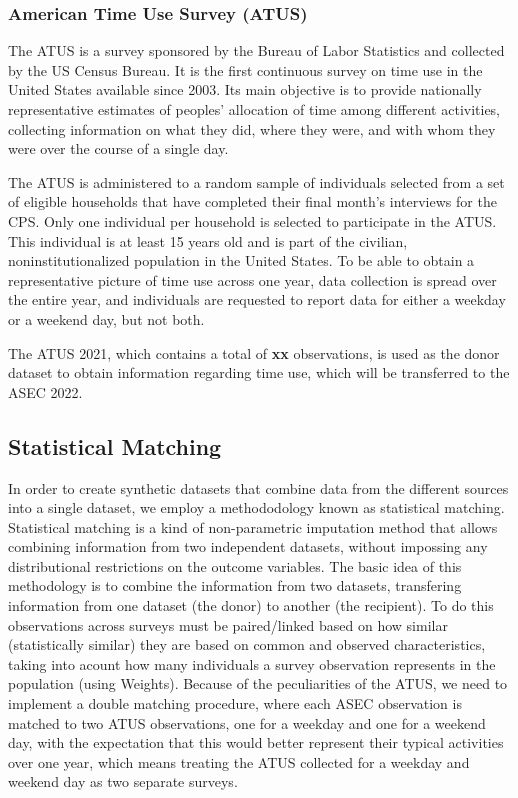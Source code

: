 \documentclass[
  11pt,
]{article}
\begin{document}
\subsubsection{American Time Use Survey
(ATUS)}\label{american-time-use-survey-atus}

The ATUS is a survey sponsored by the Bureau of Labor Statistics and
collected by the US Census Bureau. It is the first continuous survey on
time use in the United States available since 2003. Its main objective
is to provide nationally representative estimates of peoples' allocation
of time among different activities, collecting information on what they
did, where they were, and with whom they were over the course of a
single day.

The ATUS is administered to a random sample of individuals selected from
a set of eligible households that have completed their final month's
interviews for the CPS. Only one individual per household is selected to
participate in the ATUS. This individual is at least 15 years old and is
part of the civilian, noninstitutionalized population in the United
States. To be able to obtain a representative picture of time use across
one year, data collection is spread over the entire year, and
individuals are requested to report data for either a weekday or a
weekend day, but not both.

The ATUS 2021, which contains a total of \textbf{xx} observations, is
used as the donor dataset to obtain information regarding time use,
which will be transferred to the ASEC 2022.

\subsection{Statistical Matching}\label{statistical-matching}

In order to create synthetic datasets that combine data from the
different sources into a single dataset, we employ a methododology known
as statistical matching. Statistical matching is a kind of
non-parametric imputation method that allows combining information from
two independent datasets, without impossing any distributional
restrictions on the outcome variables. The basic idea of this
methodology is to combine the information from two datasets, transfering
information from one dataset (the donor) to another (the recipient). To
do this observations across surveys must be paired/linked based on how
similar (statistically similar) they are based on common and observed
characteristics, taking into acount how many individuals a survey
observation represents in the population (using Weights). Because of the
peculiarities of the ATUS, we need to implement a double matching
procedure, where each ASEC observation is matched to two ATUS
observations, one for a weekday and one for a weekend day, with the
expectation that this would better represent their typical activities
over one year, which means treating the ATUS collected for a weekday and
weekend day as two separate surveys.
\end{document}
